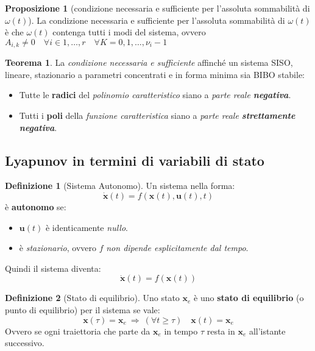 \documentclass[a4paper]{article}
\renewcommand{\vec}{\bm}
\theoremstyle{definition}
\newtheorem{thm}{Teorema}[subsection]
\newtheorem{defn}{Definizione}[subsection]
\newtheorem{prop}{Proposizione}[subsection]
\begin{document}
				\begin{prop}[condizione necessaria e sufficiente per l'assoluta sommabilità di $ \omega(t) $]
					La condizione necessaria e sufficiente per l'assoluta sommabilità di $ \omega(t) $ è che $ \omega(t) $ contenga tutti i modi del sistema, ovvero $ A_{i, k} \neq 0\quad \forall i\in 1,\dots, r\quad \forall K= 0,1,\dots,\nu_i-1 $
				\end{prop}
				
				\begin{thm}
					La \textit{condizione necessaria e sufficiente} affinché un sistema SISO, lineare, stazionario a parametri concentrati e in forma minima sia BIBO stabile:
					\begin{itemize}
						\item Tutte le \textbf{radici} del \textit{polinomio caratteristico} siano a \textit{parte reale \textbf{negativa}}.
						\item Tutti i \textbf{poli} della \textit{funzione caratteristica} siano a \textit{parte reale \textbf{strettamente negativa}}.
					\end{itemize}
				\end{thm}
				
			\subsection{Lyapunov in termini di variabili di stato}
				\begin{defn}[Sistema Autonomo]
					Un sistema nella forma:
				\[
					\vec{\dot{x}} (t) = f(\vec{x}(t), \vec{u}(t), t)
				\]
				è \textbf{autonomo} se:
				\begin{itemize}
					\item $ \vec{u}(t) $ è identicamente \textit{nullo}.
					\item è \textit{stazionario}, ovvero $ f $ \textit{non dipende esplicitamente dal tempo}.
				\end{itemize}
				Quindi il sistema diventa:
				\[
					\vec{\dot{x}}(t) = f(\vec{x}(t))
				\]
				\end{defn}
				
				\begin{defn}[Stato di equilibrio]
					Uno stato $ \vec{x}_e $ è uno \textbf{stato di equilibrio} (o punto di equilibrio) per il sistema se vale:
					\[
						\vec{x}(\tau) = \vec{x}_e\ \Rightarrow\ (\forall t\geq \tau)\quad \vec{x}(t) = \vec{x}_e
					\]
					Ovvero se ogni traiettoria che parte da $ \vec{x}_e $ in tempo $ \tau $ resta in $ \vec{x}_e $ all'istante successivo.
				\end{defn}
				
\end{document}
